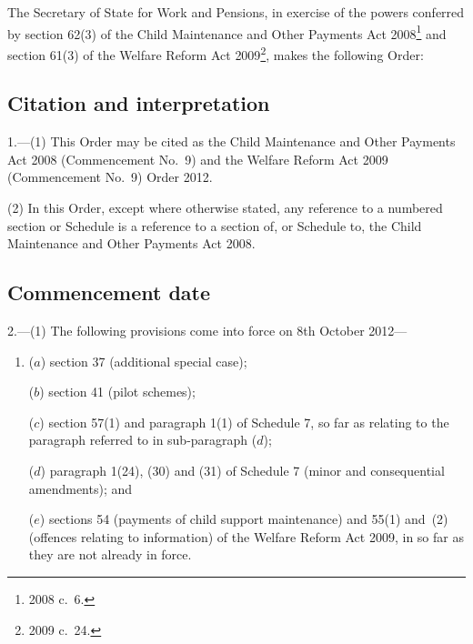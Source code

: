 \documentclass[12pt,a4paper]{article}
\title{\regstitle}
\author{S.I.\ 2012 No.\ 2523 (C.~101)}
\date{Made
4th October 2012
}
\begin{document}
\maketitle

\noindent
The Secretary of State for Work and Pensions, in exercise of the powers conferred by section 62(3) of the Child Maintenance and Other Payments Act 2008\footnote{2008 c.~6.} and section 61(3) of the Welfare Reform Act 2009\footnote{2009 c.~24.}, makes the following Order: 

{\sloppy

\tableofcontents

}

\bigskip

\setcounter{secnumdepth}{-2}

\subsection[1. Citation and interpretation]{Citation and interpretation}

1.---(1)  This Order may be cited as the Child Maintenance and Other Payments Act 2008 (Commencement No.~9) and the Welfare Reform Act 2009 (Commencement No.~9) Order 2012.

(2) In this Order, except where otherwise stated, any reference to a numbered section or Schedule is a reference to a section of, or Schedule to, the Child Maintenance and Other Payments Act 2008.

\subsection[2. Commencement date]{Commencement date}

2.---(1)  The following provisions come into force on 8th October 2012—
\begin{enumerate}\item[]
($a$) section 37 (additional special case);

($b$) section 41 (pilot schemes);

($c$) section 57(1) and paragraph 1(1) of Schedule 7, so far as relating to the paragraph referred to in sub-paragraph ($d$);

($d$) paragraph 1(24), (30) and (31) of Schedule 7 (minor and consequential amendments); and

($e$) sections 54 (payments of child support maintenance) and 55(1) and~(2) (offences relating to information) of the Welfare Reform Act 2009, in so far as they are not already in force.
\end{enumerate}
\end{document}
